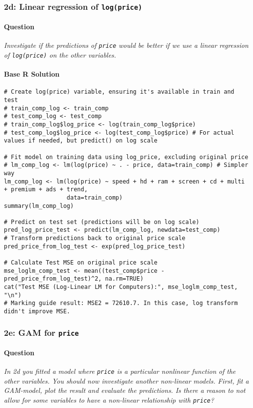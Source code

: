 \documentclass[12pt,a4paper]{article}
\newcommand{\Rcode}[1]{\texttt{#1}} %
\begin{document}
    \subsubsection{2d: Linear regression of \Rcode{log(price)}}
        \paragraph{Question}
        \textit{Investigate if the predictions of \Rcode{price} would be better if we use a linear regression of \Rcode{log(price)} on the other variables.}
        \paragraph{Base R Solution}
\begin{lstlisting}
# Create log(price) variable, ensuring it's available in train and test
# train_comp_log <- train_comp
# test_comp_log <- test_comp
# train_comp_log$log_price <- log(train_comp_log$price)
# test_comp_log$log_price <- log(test_comp_log$price) # For actual values if needed, but predict() on log scale

# Fit model on training data using log_price, excluding original price
# lm_comp_log <- lm(log(price) ~ . - price, data=train_comp) # Simpler way
lm_comp_log <- lm(log(price) ~ speed + hd + ram + screen + cd + multi + premium + ads + trend, 
                  data=train_comp)
summary(lm_comp_log)

# Predict on test set (predictions will be on log scale)
pred_log_price_test <- predict(lm_comp_log, newdata=test_comp)
# Transform predictions back to original price scale
pred_price_from_log_test <- exp(pred_log_price_test)

# Calculate Test MSE on original price scale
mse_loglm_comp_test <- mean((test_comp$price - pred_price_from_log_test)^2, na.rm=TRUE)
cat("Test MSE (Log-Linear LM for Computers):", mse_loglm_comp_test, "\n")
# Marking guide result: MSE2 = 72610.7. In this case, log transform didn't improve MSE.
\end{lstlisting}

    \subsubsection{2e: GAM for \Rcode{price}}
        \paragraph{Question}
        \textit{In 2d you fitted a model where \Rcode{price} is a particular nonlinear function of the other variables. You should now investigate another non-linear models. First, fit a GAM-model, plot the result and evaluate the predictions. Is there a reason to not allow for some variables to have a non-linear relationship with \Rcode{price}?}
\end{document}
